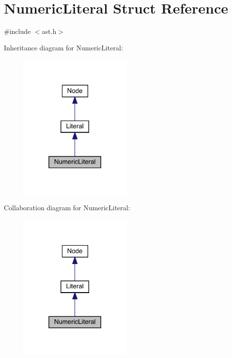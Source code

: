 \hypertarget{struct_numeric_literal}{}\section{Numeric\+Literal Struct Reference}
\label{struct_numeric_literal}


{\ttfamily \#include $<$ast.\+h$>$}



Inheritance diagram for Numeric\+Literal\+:\nopagebreak
\begin{figure}[H]
\begin{center}
\leavevmode
\includegraphics[width=160pt]{struct_numeric_literal__inherit__graph}
\end{center}
\end{figure}


Collaboration diagram for Numeric\+Literal\+:\nopagebreak
\begin{figure}[H]
\begin{center}
\leavevmode
\includegraphics[width=160pt]{struct_numeric_literal__coll__graph}
\end{center}
\end{figure}
